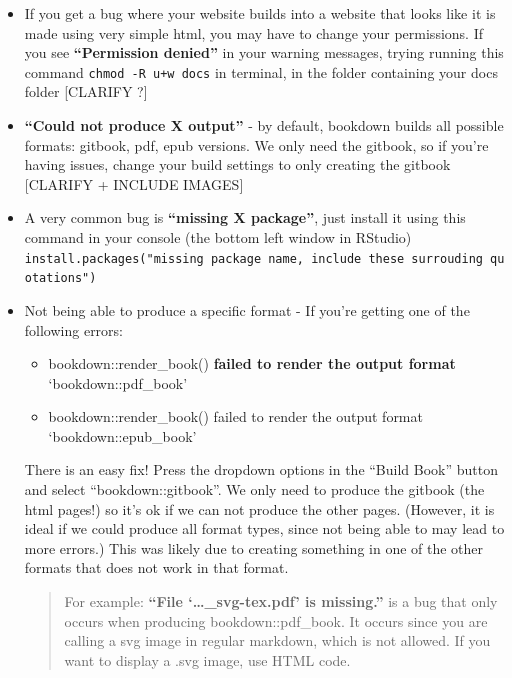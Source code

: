 \documentclass[
]{book}
\providecommand{\tightlist}{%
  \setlength{\itemsep}{0pt}\setlength{\parskip}{0pt}}
\theoremstyle{definition}
\theoremstyle{definition}
\theoremstyle{definition}
\theoremstyle{definition}
\theoremstyle{remark}
\begin{document}
\begin{itemize}
\item
  If you get a bug where your website builds into a website that looks like it is made using very simple html, you may have to change your permissions. If you see \textbf{``Permission denied''} in your warning messages, trying running this command \texttt{chmod\ -R\ u+w\ docs} in terminal, in the folder containing your docs folder {[}CLARIFY ?{]}
\item
  \textbf{``Could not produce X output''} - by default, bookdown builds all possible formats: gitbook, pdf, epub versions. We only need the gitbook, so if you're having issues, change your build settings to only creating the gitbook {[}CLARIFY + INCLUDE IMAGES{]}
\item
  A very common bug is \textbf{``missing X package''}, just install it using this command in your console (the bottom left window in RStudio) \texttt{install.packages("missing\ package\ name,\ include\ these\ surrouding\ quotations")}
\item
  Not being able to produce a specific format - If you're getting one of the following errors:

  \begin{itemize}
  \tightlist
  \item
    bookdown::render\_book() \textbf{failed to render the output format} `bookdown::pdf\_book'
  \item
    bookdown::render\_book() failed to render the output format `bookdown::epub\_book'
  \end{itemize}

  There is an easy fix! Press the dropdown options in the ``Build Book'' button and select ``bookdown::gitbook''. We only need to produce the gitbook (the html pages!) so it's ok if we can not produce the other pages. (However, it is ideal if we could produce all format types, since not being able to may lead to more errors.) This was likely due to creating something in one of the other formats that does not work in that format.

  \begin{quote}
  For example: \textbf{``File `\ldots\_svg-tex.pdf' is missing.''} is a bug that only occurs when producing bookdown::pdf\_book. It occurs since you are calling a svg image in regular markdown, which is not allowed. If you want to display a .svg image, use HTML code.
  \end{quote}
\end{itemize}
\end{document}
